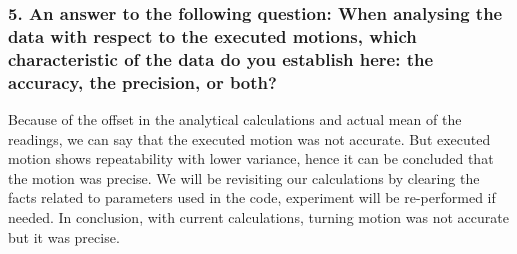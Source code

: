 \subsubsection*{5. An answer to the following question: When analysing the data with respect to the executed motions, which characteristic of the data do you establish here: the accuracy, the precision, or both?}

Because of the offset in the analytical calculations and actual mean of the readings, we can say that the executed motion was not accurate. But executed motion shows repeatability with lower variance, hence it can be concluded that the motion was precise. We will be revisiting our calculations by clearing the facts related to parameters used in the code, experiment will be re-performed if needed. In conclusion, with current calculations, turning motion was not accurate but it was precise. 
